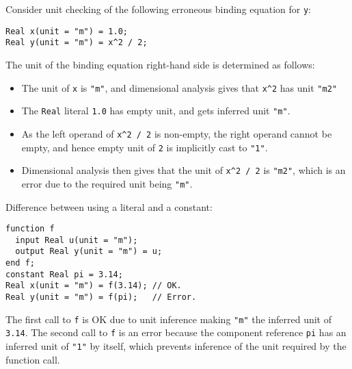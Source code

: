 \begin{example}
Consider unit checking of the following erroneous binding equation for \lstinline!y!:
\begin{lstlisting}[language=modelica]
Real x(unit = "m") = 1.0;
Real y(unit = "m") = x^2 / 2;
\end{lstlisting}
The unit of the binding equation right-hand side is determined as follows:
\begin{itemize}
\item The unit of \lstinline!x! is \lstinline!"m"!, and dimensional analysis gives that \lstinline!x^2! has unit \lstinline!"m2"!
\item The \lstinline!Real! literal \lstinline!1.0! has empty unit, and gets inferred unit \lstinline!"m"!.
\item As the left operand of \lstinline!x^2 / 2! is non-empty, the right operand cannot be empty, and hence empty unit of \lstinline!2! is implicitly cast to \lstinline!"1"!.
\item Dimensional analysis then gives that the unit of \lstinline!x^2 / 2! is \lstinline!"m2"!, which is an error due to the required unit being \lstinline!"m"!.
\end{itemize}
\end{example}

\begin{example}
Difference between using a literal and a constant:
\begin{lstlisting}[language=modelica]
function f
  input Real u(unit = "m");
  output Real y(unit = "m") = u;
end f;
constant Real pi = 3.14;
Real x(unit = "m") = f(3.14); // OK.
Real y(unit = "m") = f(pi);   // Error.
\end{lstlisting}
The first call to \lstinline!f! is OK due to unit inference making \lstinline!"m"! the inferred unit of \lstinline!3.14!.
The second call to \lstinline!f! is an error because the component reference \lstinline!pi! has an inferred unit of \lstinline!"1"! by itself, which prevents inference of the unit required by the function call.
\end{example}

